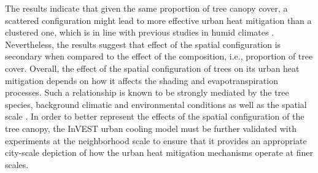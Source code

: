 \documentclass[10pt,letterpaper]{article}
\begin{document}
The results indicate that given the same proportion of tree canopy cover, a scattered configuration might lead to more effective urban heat mitigation than a clustered one, which is in line with previous studies in humid climates \cite{zhou2011does,kong2014effects,estoque2017effects,zhou2017effects,yu2018strong,nastran2019urban}.
Nevertheless, the results suggest that effect of the spatial configuration is secondary when compared to the effect of the composition, i.e., proportion of tree cover.
Overall, the effect of the spatial configuration of trees on its urban heat mitigation depends on how it affects the shading and evapotranspiration processes.
Such a relationship is known to be strongly mediated by the tree species, background climatic and environmental conditions as well as the spatial scale \cite{li2013relationship,estoque2017effects,zhou2017effects,jiao2017patch,yu2018strong,yan2019testing,wang2020significant,terfa2020spatial}.
In order to better represent the effects of the spatial configuration of the tree canopy, the InVEST urban cooling model must be further validated with experiments at the neighborhood scale to ensure that it provides an appropriate city-scale depiction of how the urban heat mitigation mechanisms operate at finer scales.
\end{document}

